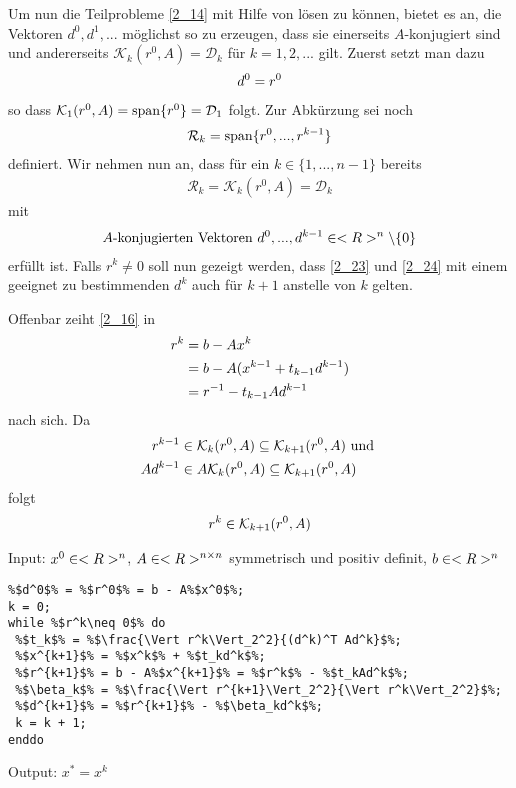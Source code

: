 Um nun die Teilprobleme \cref{2_14} mit Hilfe von  lösen zu können, bietet es an, die Vektoren $d^0,d^1,...$ möglichst so zu erzeugen, dass sie einerseits $A$-konjugiert sind und andererseits $\mathcal{K}_k(r^0,A)=\mathcal{D}_k$ für $k=1,2,...$ gilt. Zuerst setzt man dazu
\begin{align}
	d^0=r^0\notag
\end{align}
so dass $\mathcal{K}_1(r^0,A)=\operatorname{span}\{r^0\}=\mathcal{D}_1$ folgt. Zur Abkürzung sei noch
\begin{align}
	\mathcal{R}_k=\operatorname{span}\{r^0,...,r^{k-1}\}\notag
\end{align}
definiert. Wir nehmen nun an, dass für ein $k\in\{1,...,n-1\}$ bereits
\begin{align}
	\label{2_23}
	\mathcal{R}_k = \mathcal{K}_k(r^0,A)=\mathcal{D}_k
\end{align}
mit
\begin{align}
	\label{2_24}
	A\text{-konjugierten Vektoren } d^0,...,d^{k-1}\in<R>^n\backslash\{0\}
\end{align}
erfüllt ist. Falls $r^k\neq 0$ soll nun gezeigt werden, dass \cref{2_23} und \cref{2_24} mit einem geeignet zu bestimmenden $d^k$ auch für $k+1$ anstelle von $k$ gelten.

Offenbar zeiht \cref{2_16} in 
\begin{align}
	r^k &= b-Ax^k \notag \\
	&= b-A(x^{k-1}+t_{k-1}d^{k-1}) \notag \\
	&= r^{-1} - t_{k-1}Ad^{k-1} \notag
\end{align}
nach sich. Da
\begin{align}
	r^{k-1}&\in\mathcal{K}_k(r^0,A)\subseteq\mathcal{K}_{k+1}(r^0,A)\text{ und } \notag \\
	Ad^{k-1}&\in A\mathcal{K}_k(r^0,A)\subseteq\mathcal{K}_{k+1}(r^0,A) \notag
\end{align}
folgt
\begin{align}
	r^k\in\mathcal{K}_{k+1}(r^0,A)\notag
\end{align}

\begin{algorithm}[CG-Verfahren]
	Input: $x^0\in<R>^n$, $A\in<R>^{n \times n}$ symmetrisch und positiv definit, $b\in<R>^n$
	\begin{lstlisting}
%$d^0$% = %$r^0$% = b - A%$x^0$%;
k = 0;
while %$r^k\neq 0$% do
 %$t_k$% = %$\frac{\Vert r^k\Vert_2^2}{(d^k)^T Ad^k}$%;
 %$x^{k+1}$% = %$x^k$% + %$t_kd^k$%;
 %$r^{k+1}$% = b - A%$x^{k+1}$% = %$r^k$% - %$t_kAd^k$%;
 %$\beta_k$% = %$\frac{\Vert r^{k+1}\Vert_2^2}{\Vert r^k\Vert_2^2}$%;
 %$d^{k+1}$% = %$r^{k+1}$% - %$\beta_kd^k$%;
 k = k + 1;
enddo
	\end{lstlisting}
	Output: $x^\ast=x^k$
\end{algorithm}

